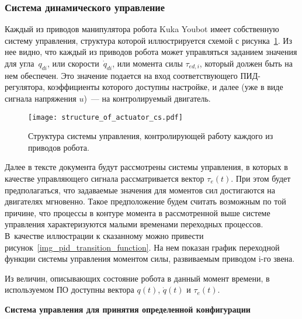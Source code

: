 \subsubsection{Система динамического управление}\label{part_dynamic_control}

Каждый из приводов манипулятора робота Kuka Youbot имеет собственную систему управления, структура которой иллюстрируется схемой с рисунка~\ref{img_structure_of_actuator_cs}.
Из нее видно, что каждый из приводов робота может управляться заданием значения для угла~$q_{di}$, или скорости~$\dot{q}_{di}$, или момента силы $\tau_{ed,i}$, который должен быть на нем обеспечен.
Это значение подается на вход соответствующего ПИД-регулятора, коэффициенты которого доступны настройке, и далее (уже в виде сигнала напряжения $u$)~--- на контролируемый двигатель.

\vspace{0.5cm}

\begin{figure}[h!]
	\centering\texttt{[image: structure\_of\_actuator\_cs.pdf]}
	\caption{Структура системы управления, контролирующей работу каждого из приводов робота.}
	\label{img_structure_of_actuator_cs}
\end{figure}

Далее в тексте документа будут рассмотрены системы управления, в которых в качестве управляющего сигнала рассматривается вектор $\tau_e(t)$.
При этом будет предполагаться, что задаваемые значения для моментов сил достигаются на двигателях мгновенно.
Такое предположение будем считать возможным по той причине, что процессы в контуре момента в рассмотренной выше системе управления характеризуются малыми временами переходных процессов.
В~качестве иллюстрации к сказанному можно привести рисунок~\ref{img_pid_transition_function}.
На нем показан график переходной функции системы управления моментом силы, развиваемым приводом i-го звена.

Из величин, описывающих состояние робота в данный момент времени, в используемом ПО доступны вектора $q(t)$, $\dot{q}(t)$ и $\tau_e(t)$.


\textbf{Система управления для принятия определенной конфигурации}

